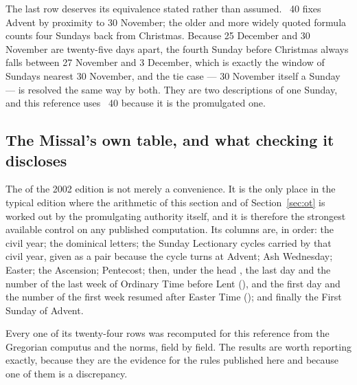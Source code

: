 The last row deserves its equivalence stated rather than assumed. ~40 fixes Advent by
proximity to 30 November; the older and more widely quoted formula counts four Sundays back from
Christmas. Because 25 December and 30 November are twenty-five days apart, the fourth Sunday before
Christmas always falls between 27 November and 3 December, which is exactly the window of Sundays
nearest 30 November, and the tie case --- 30 November itself a Sunday --- is resolved the same way by
both. They are two descriptions of one Sunday, and this reference uses ~40 because it is
the promulgated one.

\subsection{The Missal's own table, and what checking it discloses}
\label{sec:tabella}

The  of the 2002 edition is not merely a convenience. It is the only place
in the typical edition where the arithmetic of this section and of Section~\ref{sec:ot} is worked out by the
promulgating authority itself, and it is therefore the strongest available control on any published
computation. Its columns are, in order: the civil year; the dominical letters; the Sunday Lectionary
cycles carried by that civil year, given as a pair because the cycle turns at Advent; Ash Wednesday;
Easter; the Ascension; Pentecost; then, under the head , the last day and
the number of the last week of Ordinary Time before Lent (),
and the first day and the number of the first week resumed after Easter Time (); and finally the First Sunday of Advent.

Every one of its twenty-four rows was recomputed for this reference from the Gregorian computus and
the norms, field by field. The results are worth reporting exactly, because they are the evidence
for the rules published here and because one of them is a discrepancy.

